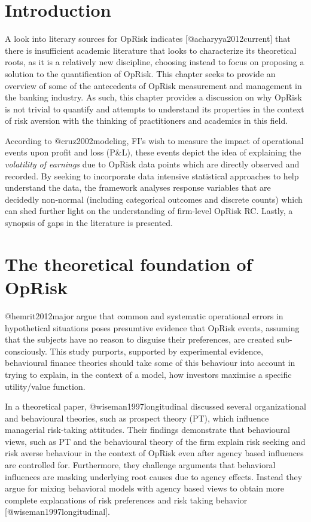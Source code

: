 \documentclass[]{article}
\title{}
\author{}
\date{}
\begin{document}
\doublespacing

\section{Introduction}
\label{sec2:Introduction}

A look into literary sources for OpRisk indicates
{[}@acharyya2012current{]} that there is insufficient academic
literature that looks to characterize its theoretical roots, as it is a
relatively new discipline, choosing instead to focus on proposing a
solution to the quantification of OpRisk. This chapter seeks to provide
an overview of some of the antecedents of OpRisk measurement and
management in the banking industry. As such, this chapter provides a
discussion on why OpRisk is not trivial to quantify and attempts to
understand its properties in the context of risk aversion with the
thinking of practitioners and academics in this field.\medskip

According to @cruz2002modeling, FI's wish to measure the impact of
operational events upon profit and loss (P\&L), these events depict the
idea of explaining the \emph{volatility of earnings} due to OpRisk data
points which are directly observed and recorded. By seeking to
incorporate data intensive statistical approaches to help understand the
data, the framework analyses response variables that are decidedly
non-normal (including categorical outcomes and discrete counts) which
can shed further light on the understanding of firm-level OpRisk RC.
Lastly, a synopsis of gaps in the literature is presented.

\section{The theoretical foundation of OpRisk}
\label{sec:The theoretical foundation of OpRisk}

@hemrit2012major argue that common and systematic operational errors in
hypothetical situations poses presumtive evidence that OpRisk events,
assuming that the subjects have no reason to disguise their preferences,
are created sub-consciously. This study purports, supported by
experimental evidence, behavioural finance theories should take some of
this behaviour into account in trying to explain, in the context of a
model, how investors maximise a specific utility/value function.\medskip

In a theoretical paper, @wiseman1997longitudinal discussed several
organizational and behavioural theories, such as prospect theory (PT),
which influence managerial risk-taking attitudes. Their findings
demonstrate that behavioural views, such as PT and the behavioural
theory of the firm explain risk seeking and risk averse behaviour in the
context of OpRisk even after agency based influences are controlled for.
Furthermore, they challenge arguments that behavioral influences are
masking underlying root causes due to agency effects. Instead they argue
for mixing behavioral models with agency based views to obtain more
complete explanations of risk preferences and risk taking behavior
{[}@wiseman1997longitudinal{]}. \medskip
\end{document}
